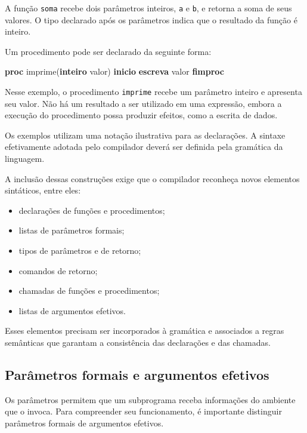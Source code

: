 \documentclass[
  brazilian,
  letterpaper,
]{book}
\newenvironment{Shaded}{\begin{snugshade}}{\end{snugshade}}
\newcommand{\KeywordTok}[1]{\textcolor[rgb]{0.00,0.23,0.31}{\textbf{#1}}}
\newcommand{\NormalTok}[1]{\textcolor[rgb]{0.00,0.23,0.31}{#1}}
\providecommand{\tightlist}{%
  \setlength{\itemsep}{0pt}\setlength{\parskip}{0pt}}
\theoremstyle{plain}
\theoremstyle{definition}
\theoremstyle{remark}
\begin{document}
A função \texttt{soma} recebe dois parâmetros inteiros, \texttt{a} e
\texttt{b}, e retorna a soma de seus valores. O tipo declarado após os
parâmetros indica que o resultado da função é inteiro.

Um procedimento pode ser declarado da seguinte forma:

\begin{Shaded}
\begin{Highlighting}[]
\KeywordTok{proc}\NormalTok{ imprime(}\KeywordTok{inteiro}\NormalTok{ valor)}
\KeywordTok{inicio}
    \KeywordTok{escreva}\NormalTok{ valor}
\KeywordTok{fimproc}
\end{Highlighting}
\end{Shaded}

Nesse exemplo, o procedimento \texttt{imprime} recebe um parâmetro
inteiro e apresenta seu valor. Não há um resultado a ser utilizado em
uma expressão, embora a execução do procedimento possa produzir efeitos,
como a escrita de dados.

Os exemplos utilizam uma notação ilustrativa para as declarações. A
sintaxe efetivamente adotada pelo compilador deverá ser definida pela
gramática da linguagem.

A inclusão dessas construções exige que o compilador reconheça novos
elementos sintáticos, entre eles:

\begin{itemize}
\tightlist
\item
  declarações de funções e procedimentos;
\item
  listas de parâmetros formais;
\item
  tipos de parâmetros e de retorno;
\item
  comandos de retorno;
\item
  chamadas de funções e procedimentos;
\item
  listas de argumentos efetivos.
\end{itemize}

Esses elementos precisam ser incorporados à gramática e associados a
regras semânticas que garantam a consistência das declarações e das
chamadas.

\subsection{Parâmetros formais e argumentos
efetivos}\label{paruxe2metros-formais-e-argumentos-efetivos}

Os parâmetros permitem que um subprograma receba informações do ambiente
que o invoca. Para compreender seu funcionamento, é importante
distinguir parâmetros formais de argumentos efetivos.
\end{document}
